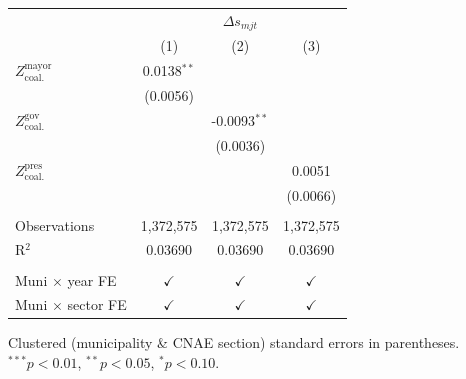 \begingroup
\centering
\begin{tabular}{lccc}
   \toprule
    & \multicolumn{3}{c}{$\Delta s_{mjt}$}\\
                                       & (1)           & (2)            & (3)\\  
   \midrule 
   $Z^{\text{mayor}}_{\text{coal.}}$   & 0.0138$^{**}$ &                &   \\   
                                       & (0.0056)      &                &   \\   
   $Z^{\text{gov}}_{\text{coal.}}$     &               & -0.0093$^{**}$ &   \\   
                                       &               & (0.0036)       &   \\   
   $Z^{\text{pres}}_{\text{coal.}}$    &               &                & 0.0051\\   
                                       &               &                & (0.0066)\\   
    \\
   Observations                        & 1,372,575     & 1,372,575      & 1,372,575\\  
   R$^2$                               & 0.03690       & 0.03690        & 0.03690\\  
    \\
   Muni $\times$ year FE               & $\checkmark$  & $\checkmark$   & $\checkmark$\\   
   Muni $\times$ sector FE             & $\checkmark$  & $\checkmark$   & $\checkmark$\\   
   \bottomrule
\end{tabular}
 
\par \raggedright 
Clustered (municipality \& CNAE section) standard errors in parentheses. $^{***}p<0.01$, $^{**}p<0.05$, $^{*}p<0.10$.
\par\endgroup

